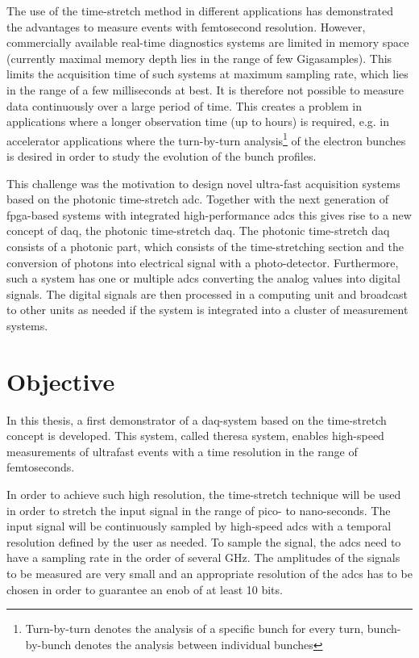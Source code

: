 The use of the time-stretch method in different applications has demonstrated the advantages to measure events with femtosecond resolution.
However, commercially available real-time diagnostics systems are limited in memory space (currently maximal memory depth lies in the range of few Gigasamples). 
This limits the acquisition time of such systems at maximum sampling rate, which lies in the range of a few milliseconds at best.
It is therefore not possible to measure data continuously over a large period of time. 
This creates a problem in applications where a longer observation time (up to hours) is required, e.g. in accelerator applications where the turn-by-turn analysis\footnote{Turn-by-turn denotes the analysis of a specific bunch for every turn, bunch-by-bunch denotes the analysis between individual bunches} of the electron bunches is desired in order to study the evolution of the bunch profiles. 

This challenge was the motivation to design novel ultra-fast acquisition systems based on the photonic time-stretch \gls{adc}. 
Together with the next generation of \gls{fpga}-based systems with integrated high-performance \glspl{adc} this gives rise to a new concept of \gls{daq}, the photonic time-stretch \gls{daq}.
The photonic time-stretch \gls{daq} consists of a photonic part, which consists of the time-stretching section and the conversion of photons into electrical signal with a photo-detector. 
Furthermore, such a system has one or multiple \glspl{adc} converting the analog values into digital signals.
The digital signals are then processed in a computing unit and broadcast to other units as needed if the system is integrated into a cluster of measurement systems. %
 

\section{Objective}
In this thesis, a first demonstrator of a \gls{daq}-system based on the time-stretch concept is developed.
This system, called \gls{theresa} system, enables high-speed measurements of ultrafast events with a time resolution in the range of femtoseconds.

In order to achieve such high resolution, the time-stretch technique will be used in order to stretch the input signal in the range of pico- to nano-seconds.
The input signal will be continuously sampled by high-speed \glspl{adc} with a temporal resolution defined by the user as needed.
To sample the signal, the \glspl{adc} need to have a sampling rate in the order of several \si{\GHz}.
The amplitudes of the signals to be measured are very small and an appropriate resolution of the \glspl{adc} has to be chosen in order to guarantee an \gls{enob} of at least 10 bits. \cite{bielwaski}

